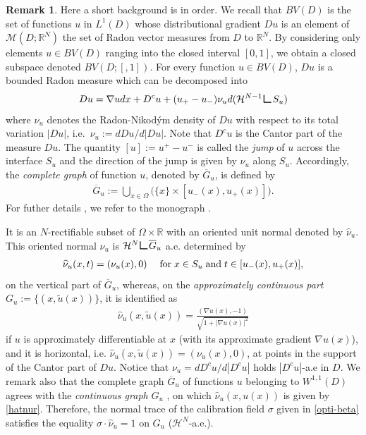 \documentclass[reqno,11pt]{amsart}
\theoremstyle{definition}
\newtheorem{remark}[theorem]{Remark}
\numberwithin{equation}{section}
\def\ov{\overline}
\newcommand{\HH}{\mathcal{H}}
\newcommand{\RR}{\mathbb{R}}
\def\R{\mathbb{R}}
\newcommand{\tinm}[1]{\text{\;#1\;}}
\newcommand{\1}{{{\bf 1}\kern-0,28em\rm l}}
\def\res{\text{\huge$\llcorner$}}
\begin{document}
\begin{remark}\label{background} Here a short  background is in order. 
We recall that $BV(D)$ is the set of functions $u$ in $L^1(D)$ whose distributional gradient $Du$ is an element of $\mathcal {M}(D;\R^N)$ the set of  Radon vector measures from $D$ to $\R^N$. By considering only elements  $u\in BV(D)$ ranging into the closed interval $[0,1]$,
 we obtain a closed subspace denoted $BV(D;[,1])$.
For every function $u\in BV(D)$,  $Du$ is a bounded Radon measure which can be decomposed into 
\begin{align}\label{decompo}
Du = \nabla u dx + D^c u + (u_+ - u_-) \nu_u d(\HH^{N-1}\res S_u)
\end{align}
where $\nu_u$ denotes the Radon-Nikod\'ym density of   $Du$ with respect to its total variation $|Du|$, i.e.~$\nu_u:= dDu/d|Du|$. Note that $D^cu$ is the Cantor part of the measure $Du$. The quantity $[u]:= u^+ - u^-$ is called the {\it jump} of $u$ across the interface $S_u$ and the direction of the jump is given by $\nu_u$ along $S_u$. Accordingly, the {\it complete graph} of function $u$, denoted by $\ov G_u$, is  defined by 
\begin{align*}
\ov G_u:= \bigcup_{x\in\Omega} \Big( \{x\}\times[u_-(x), u_+(x)] \Big).
\end{align*}
For futher details , we refer to the monograph \cite{mua1992bv}.
\end{remark}


It is an $N$-rectifiable subset of $\Omega\times\RR$ with an oriented unit normal denoted by $\widehat \nu_u$. This oriented  normal $\widehat\nu_u$ is $\HH^N\res\ov G_u$ a.e. determined by 
\begin{align}\label{hatnus}
\widehat\nu_u (x,t) = (\nu_u(x),0) \quad \tinm{for} x\in S_u \tinm{and} t\in [u_-(x), u_+(x)],
\end{align}
on the vertical part of $\ov G_u$, whereas, on the {\it approximately continuous part}  $G_u:=\{ (x, \tilde u(x))\}$, it is identified as
\begin{align}
\widehat\nu_u (x,\tilde u(x)) = \frac{(\nabla u(x), -1)}{\sqrt{1+ |\nabla u(x)|^2}}\label{hatnur}
\end{align}
if $u$ is approximately differentiable at $x$ (with its approximate gradient $\nabla u(x)$), and it is horizontal, i.e. $\widehat\nu_u (x,\tilde u(x))= (\nu_u(x),0)$, at points in the support of the Cantor part of $Du$. Notice that $\nu_u= dD^c u/ d|D^c u|$ holds $|D^c u|$-a.e in $D$. We remark also that the complete graph $\ov G_u$ of functions $u$ belonging to $W^{1,1}(D)$ agrees with the {\it continuous graph} $G_u$ , on which $\widehat \nu_u(x,u(x))$ is given by \eqref{hatnur}.
Therefore, the normal trace of the calibration field $\sigma$ given in \eqref{opti-beta} satisfies the equality  $\sigma \cdot \widehat \nu_u =1$
 on $G_u$ ($\HH^N$-a.e.).
\end{document}

